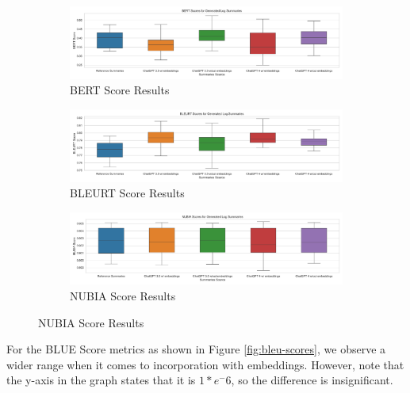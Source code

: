 \documentclass[conference]{IEEEtran}
\begin{document}
\begin{figure}[t]

\begin{subfigure}{\textwidth}
    \centering
    \includegraphics[width=\textwidth]{final/img/results/bert-scores.png}
    \caption{BERT Score Results}
    \label{fig:bert-scores}
\end{subfigure}

\begin{subfigure}{\textwidth}
    \centering
    \includegraphics[width=\textwidth]{final/img/results/bleurt-scores.png}
    \caption{BLEURT Score Results}
    \label{fig:bleurt-scores}
\end{subfigure}

\begin{subfigure}{\textwidth}
    \centering
    \includegraphics[width=\textwidth]{final/img/results/nubia-scores.png}
    \caption{NUBIA Score Results}
    \label{fig:nubia-scores}
\end{subfigure}
    
\end{figure}

For the BLUE Score metrics as shown in Figure \ref{fig:bleu-scores},  we observe a wider range when it comes to incorporation with embeddings. However, note that the y-axis in the graph states that it is \(1* e^-6\), so the difference is insignificant.
\end{document}

